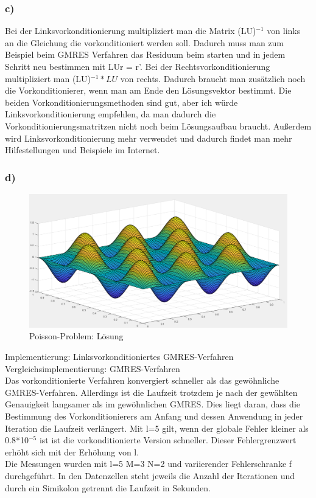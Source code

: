\documentclass{article}
\begin{document}
\subsubsection{c)}
Bei der Linksvorkonditionierung multipliziert man die Matrix (LU)$^{-1}$ von links an die Gleichung die vorkonditioniert werden soll. Dadurch muss man zum Beispiel beim GMRES Verfahren das Residuum beim starten und in jedem Schritt neu bestimmen mit LUr = r'. Bei der Rechtsvorkonditionierung multipliziert man (LU)$^{-1}*LU$ von rechts. Dadurch braucht man zusätzlich noch die Vorkonditionierer, wenn man am Ende den Lösungsvektor bestimmt. 
Die beiden Vorkonditionierungsmethoden sind gut, aber ich würde Linksvorkonditionierung empfehlen, da man dadurch die Vorkonditionierungsmatritzen nicht noch beim Lösungsaufbau braucht. Außerdem wird Linksvorkonditionierung mehr verwendet und dadurch findet man mehr Hilfestellungen und Beispiele im Internet.

\subsubsection{d)}
\begin{figure}
	\includegraphics[width=\linewidth]{Aufgaben-Ressourcen/A6L7M3N2.png}
		\caption{Poisson-Problem: Lösung}
\end{figure}

Implementierung: Linksvorkonditioniertes GMRES-Verfahren\\
Vergleichsimplementierung: GMRES-Verfahren\\
Das vorkonditionierte Verfahren konvergiert schneller als das gewöhnliche GMRES-Verfahren. Allerdings ist die Laufzeit trotzdem je nach der gewählten Genauigkeit langsamer als im gewöhnlichen GMRES. Dies liegt daran, dass die Bestimmung des Vorkonditionierers am Anfang und dessen Anwendung in jeder Iteration die Laufzeit verlängert. Mit l=5 gilt, wenn der globale Fehler kleiner als 0.8*10$^{-5}$ ist ist die vorkonditionierte Version schneller. Dieser Fehlergrenzwert erhöht sich mit der Erhöhung von l.\\
Die Messungen wurden mit l=5 M=3 N=2 und variierender Fehlerschranke f durchgeführt. In den Datenzellen steht jeweils die Anzahl der Iterationen und durch ein Simikolon getrennt die Laufzeit in Sekunden.\\
\end{document}
